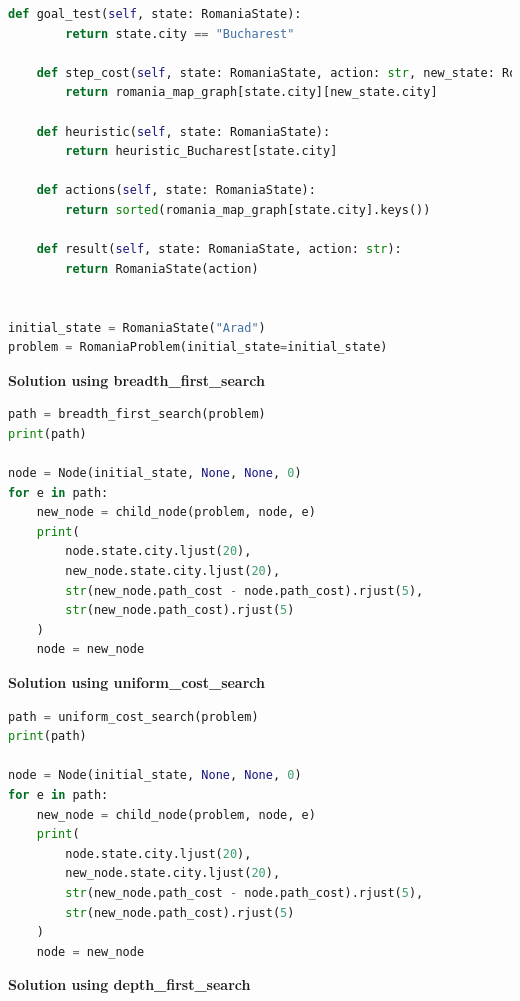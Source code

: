 \begin{lstlisting}[language=Python]
    def goal_test(self, state: RomaniaState):
        return state.city == "Bucharest"
    
    def step_cost(self, state: RomaniaState, action: str, new_state: RomaniaState):
        return romania_map_graph[state.city][new_state.city]
    
    def heuristic(self, state: RomaniaState):
        return heuristic_Bucharest[state.city]
    
    def actions(self, state: RomaniaState):
        return sorted(romania_map_graph[state.city].keys())
    
    def result(self, state: RomaniaState, action: str):
        return RomaniaState(action)


initial_state = RomaniaState("Arad")
problem = RomaniaProblem(initial_state=initial_state)
\end{lstlisting}



{\centering \textbf{Solution using breadth\_first\_search} \par}

\begin{lstlisting}[language=Python]
path = breadth_first_search(problem)
print(path)

node = Node(initial_state, None, None, 0)
for e in path:
    new_node = child_node(problem, node, e)
    print(
        node.state.city.ljust(20), 
        new_node.state.city.ljust(20), 
        str(new_node.path_cost - node.path_cost).rjust(5), 
        str(new_node.path_cost).rjust(5)
    )
    node = new_node
\end{lstlisting}


{\centering \textbf{Solution using uniform\_cost\_search} \par}

\begin{lstlisting}[language=Python]
path = uniform_cost_search(problem)
print(path)

node = Node(initial_state, None, None, 0)
for e in path:
    new_node = child_node(problem, node, e)
    print(
        node.state.city.ljust(20), 
        new_node.state.city.ljust(20), 
        str(new_node.path_cost - node.path_cost).rjust(5), 
        str(new_node.path_cost).rjust(5)
    )
    node = new_node
\end{lstlisting}



{\centering \textbf{Solution using depth\_first\_search} \par}

